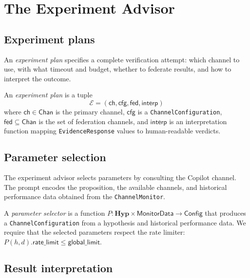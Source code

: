 \documentclass[11pt]{article}
\begin{document}
\section{The Experiment Advisor}\label{sec:experiment}

\subsection{Experiment plans}

An \emph{experiment plan} specifies a complete verification
attempt: which channel to use, with what timeout and budget,
whether to federate results, and how to interpret the outcome.

\begin{definition}\label{def:expplan}
An \emph{experiment plan} is a tuple
\[
  \mathcal{E} = (\mathsf{ch}, \mathsf{cfg}, \mathsf{fed},
                  \mathsf{interp})
\]
where $\mathsf{ch} \in \mathsf{Chan}$ is the primary channel,
$\mathsf{cfg}$ is a \texttt{ChannelConfiguration},
$\mathsf{fed} \subseteq \mathsf{Chan}$ is the set of
federation channels, and $\mathsf{interp}$ is an
interpretation function mapping \texttt{EvidenceResponse}
values to human-readable verdicts.
\end{definition}

\subsection{Parameter selection}

The experiment advisor selects parameters by consulting
the Copilot channel.  The prompt encodes the proposition,
the available channels, and historical performance data
obtained from the \texttt{ChannelMonitor}.

\begin{definition}\label{def:paramsel}
A \emph{parameter selector} is a function
$P \colon \mathbf{Hyp} \times \mathsf{MonitorData}
  \to \mathsf{Config}$
that produces a \texttt{ChannelConfiguration} from a
hypothesis and historical performance data.  We require
that the selected parameters respect the rate limiter:
$P(h, d).\mathsf{rate\_limit} \leq \mathsf{global\_limit}$.
\end{definition}

\subsection{Result interpretation}
\end{document}
